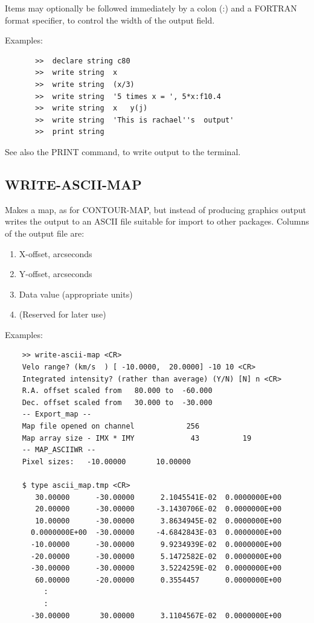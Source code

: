 \documentclass[11pt,twoside]{report}
\begin{document}
Items may optionally be followed immediately by a colon (:\index{:}) and a
FORTRAN format specifier, to control the width of the
output field. 

Examples:  
\begin{verbatim}
       >>  declare string c80
       >>  write string  x
       >>  write string  (x/3)
       >>  write string  '5 times x = ', 5*x:f10.4
       >>  write string  x   y(j)
       >>  write string  'This is rachael''s  output'
       >>  print string
\end{verbatim}

See also the PRINT command, to write output to the terminal.

\subsection{WRITE-ASCII-MAP} 

Makes a map, as for CONTOUR-MAP, but instead of producing graphics
output writes the output to an ASCII file suitable for import to other
packages. Columns of the output file are:
\begin{enumerate}
\item X-offset, arcseconds
\item Y-offset, arcseconds
\item Data value (appropriate units)
\item (Reserved for later use)
\end{enumerate}

Examples:
\begin{verbatim}
    >> write-ascii-map <CR>
    Velo range? (km/s  ) [ -10.0000,  20.0000] -10 10 <CR>
    Integrated intensity? (rather than average) (Y/N) [N] n <CR>
    R.A. offset scaled from   80.000 to  -60.000
    Dec. offset scaled from   30.000 to  -30.000
    -- Export_map --
    Map file opened on channel            256
    Map array size - IMX * IMY             43          19
    -- MAP_ASCIIWR --
    Pixel sizes:   -10.00000       10.00000    

    $ type ascii_map.tmp <CR>
       30.00000      -30.00000      2.1045541E-02  0.0000000E+00
       20.00000      -30.00000     -3.1430706E-02  0.0000000E+00
       10.00000      -30.00000      3.8634945E-02  0.0000000E+00
      0.0000000E+00  -30.00000     -4.6842843E-03  0.0000000E+00
      -10.00000      -30.00000      9.9234939E-02  0.0000000E+00
      -20.00000      -30.00000      5.1472582E-02  0.0000000E+00
      -30.00000      -30.00000      3.5224259E-02  0.0000000E+00
       60.00000      -20.00000      0.3554457      0.0000000E+00
         :
         :
      -30.00000       30.00000      3.1104567E-02  0.0000000E+00

\end{verbatim}
\end{document}
